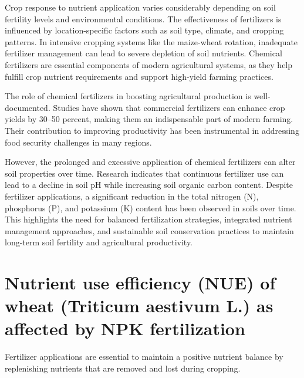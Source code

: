 \documentclass[a4paper,12pt]{article}
\begin{document}
Crop response to nutrient application varies considerably depending on soil fertility levels and environmental conditions. The effectiveness of fertilizers is influenced by location-specific factors such as soil type, climate, and cropping patterns. In intensive cropping systems like the maize-wheat rotation, inadequate fertilizer management can lead to severe depletion of soil nutrients. Chemical fertilizers are essential components of modern agricultural systems, as they help fulfill crop nutrient requirements and support high-yield farming practices.

The role of chemical fertilizers in boosting agricultural production is well-documented. Studies have shown that commercial fertilizers can enhance crop yields by 30–50 percent, making them an indispensable part of modern farming. Their contribution to improving productivity has been instrumental in addressing food security challenges in many regions.

However, the prolonged and excessive application of chemical fertilizers can alter soil properties over time. Research indicates that continuous fertilizer use can lead to a decline in soil pH while increasing soil organic carbon content. Despite fertilizer applications, a significant reduction in the total nitrogen (N), phosphorus (P), and potassium (K) content has been observed in soils over time. This highlights the need for balanced fertilization strategies, integrated nutrient management approaches, and sustainable soil conservation practices to maintain long-term soil fertility and agricultural productivity.

\section{Nutrient use efficiency (NUE) of wheat  (Triticum aestivum L.) as affected by NPK  fertilization}
\parencite{rawalNutrientUseEfficiency2022}
Fertilizer applications are essential to maintain a positive nutrient balance by replenishing nutrients that are removed and lost during cropping.
\end{document}

